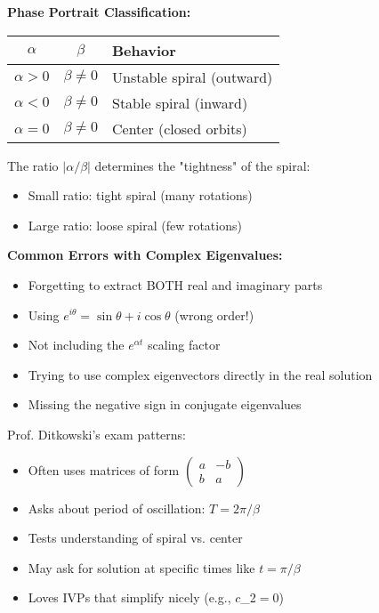 \documentclass[12pt]{article}
\begin{document}
\begin{insight}
\textbf{Phase Portrait Classification:}
\begin{center}
\begin{tabular}{|c|c|l|}
\hline
$\alpha$ & $\beta$ & Behavior \\
\hline
$\alpha > 0$ & $\beta \neq 0$ & Unstable spiral (outward) \\
$\alpha < 0$ & $\beta \neq 0$ & Stable spiral (inward) \\
$\alpha = 0$ & $\beta \neq 0$ & Center (closed orbits) \\
\hline
\end{tabular}
\end{center}

The ratio $|\alpha/\beta|$ determines the "tightness" of the spiral:
\begin{itemize}
\item Small ratio: tight spiral (many rotations)
\item Large ratio: loose spiral (few rotations)
\end{itemize}
\end{insight}

\begin{warning}
\textbf{Common Errors with Complex Eigenvalues:}
\begin{itemize}
\item Forgetting to extract BOTH real and imaginary parts
\item Using $e^{i\theta} = \sin\theta + i\cos\theta$ (wrong order!)
\item Not including the $e^{\alpha t}$ scaling factor
\item Trying to use complex eigenvectors directly in the real solution
\item Missing the negative sign in conjugate eigenvalues
\end{itemize}
\end{warning}

\begin{examtip}
Prof. Ditkowski's exam patterns:
\begin{itemize}
\item Often uses matrices of form $\begin{pmatrix} a & -b \\ b & a \end{pmatrix}$
\item Asks about period of oscillation: $T = 2\pi/\beta$
\item Tests understanding of spiral vs. center
\item May ask for solution at specific times like $t = \pi/\beta$
\item Loves IVPs that simplify nicely (e.g., $c$_{2}$ = 0$)
\end{itemize}
\end{examtip}
\end{document}
